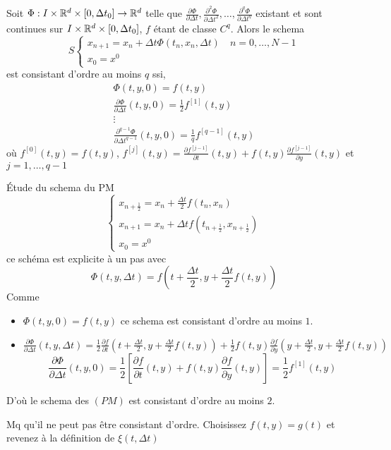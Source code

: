 \begin{prop}
    Soit $\Phi: I \times \mathbb{R}^d \times [0, \Delta t_0] \to \mathbb{R}^d$ telle que $\frac{\partial \Phi}{\partial \Delta t}, \frac{\partial^2 \Phi}{\partial \Delta t^2}, \ldots, \frac{\partial^q \Phi}{\partial \Delta t^q}$ existant et sont continues sur $I \times \mathbb{R}^d \times [0, \Delta t_0]$, $f$ étant de classe  $C^q$.
    Alors le schema  
    \[
    S \begin{cases}
        x_{n+1} = x_n + \Delta t \Phi(t_n, x_n, \Delta t) \quad n = 0, \ldots, N-1\\
        x_0 = x^0
    \end{cases}
    \] 
    est consistant d'ordre au moins $q$ ssi,
    \begin{align*}
        \Phi(t, y, 0) = f(t, y)\\
        \frac{\partial \Phi}{\partial \Delta t}(t, y, 0) = \frac{1}{2}f^{[1]}(t, y)\\
        \vdots\\
        \frac{\partial^{q-1} \Phi}{\partial \Delta t^{q-1}}(t, y, 0) = \frac{1}{q}f^{[q-1]}(t, y)
    \end{align*}
    où $f^{[0]}(t, y) = f(t, y)$,  $f^{[j]}(t, y) = \frac{\partial f^{[j-1]}}{\partial t}(t, y) + f(t, y) \frac{\partial f^{[j-1]}}{\partial y}(t, y)$ et $j = 1, \ldots, q-1$
\end{prop}
\begin{eg}
   Étude du schema du PM
   \[
   \begin{cases}
       x_{n + \frac{1}{2}} = x_n + \frac{\Delta t}{2}f(t_n, x_n)\\
       x_{n+1} = x_n + \Delta t f(t_{n + \frac{1}{2}}, x_{n + \frac{1}{2}})\\
       x_0 = x^0
   \end{cases}
   \] 
   ce schéma est explicite à un pas avec
   \[
   \Phi(t, y, \Delta t) = f(t + \frac{\Delta t}{2}, y + \frac{\Delta t}{2}f(t, y))
   \] 
   Comme 
   \begin{itemize}
       \item $\Phi(t, y, 0) = f(t, y)$ ce schema est consistant d'ordre au moins  $1$.
       \item  $\frac{\partial \Phi}{\partial \Delta t}(t, y, \Delta t) = \frac{1}{2}\frac{\partial f}{\partial t}(t + \frac{\Delta t}{2}, y + \frac{\Delta t}{2}f(t, y)) + \frac{1}{2}f(t, y) \frac{\partial f}{\partial y}(y + \frac{\Delta t}{2}, y + \frac{\Delta t}{2}f(t, y))$
           \[
               \frac{\partial \Phi}{\partial \Delta t}(t, y, 0) = \frac{1}{2} \left[ \frac{\partial f}{\partial t}(t, y) + f(t, y) \frac{\partial f}{\partial y}(t, y) \right] = \frac{1}{2}f^{[1]}(t, y)
           \] 
   \end{itemize}
   D'où le schema des $(PM)$ est consistant d'ordre au moins  $2$.
\end{eg}
\begin{ex}
   Mq qu'il ne peut pas être consistant d'ordre. Choisissez $f(t, y) = g(t)$ et revenez à la définition de $\xi(t, \Delta t)$
\end{ex}

